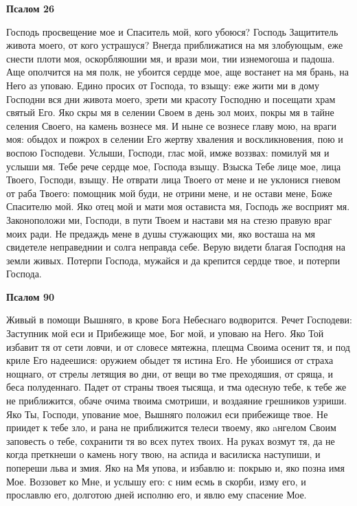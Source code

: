 \medskip


\bfseries Псалом 26\normalfont{}\nopagebreak


Господь просвещение мое и Спаситель мой, кого убоюся? Господь Защититель живота моего, от кого устрашуся? Внегда приближатися на мя злобующым, еже снести плоти моя, оскорбляюшии мя, и врази мои, тии изнемогоша и падоша. Аще ополчится на мя полк, не убоится сердце мое, аще востанет на мя брань, на Него аз уповаю. Едино просих от Господа, то взыщу: еже жити ми в дому Господни вся дни живота моего, зрети ми красоту Господню и посещати храм святый Его. Яко скры мя в селении Своем в день зол моих, покры мя в тайне селения Своего, на камень вознесе мя. И ныне се вознесе главу мою, на враги моя: обыдох и пожрох в селении Его жертву хваления и воскликновения, пою и воспою Господеви. Услыши, Господи, глас мой, имже воззвах: помилуй мя и услыши мя. Тебе рече сердце мое, Господа взыщу. Взыска Тебе лице мое, лица Твоего, Господи, взыщу. Не отврати лица Твоего от мене и не уклонися гневом от раба Твоего: помощник мой буди, не отрини мене, и не остави мене, Боже Спасителю мой. Яко отец мой и мати моя остависта мя, Господь же восприят мя. Законоположи ми, Господи, в пути Твоем и настави мя на стезю правую враг моих ради. Не предаждь мене в душы стужающих ми, яко восташа на мя свидетеле неправеднии и солга неправда себе. Верую видети благая Господня на земли живых. Потерпи Господа, мужайся и да крепится сердце твое, и потерпи Господа.


\medskip


\bfseries Псалом 90\normalfont{}\nopagebreak


Живый в помощи Вышняго, в крове Бога Небеснаго водворится. Речет Господеви: Заступник мой еси и Прибежище мое, Бог мой, и уповаю на Него. Яко Той избавит тя от сети ловчи, и от словесе мятежна, плещма Своима осенит тя, и под криле Его надеешися: оружием обыдет тя истина Его. Не убоишися от страха нощнаго, от стрелы летящия во дни, от вещи во тме преходяшия, от сряща, и беса полуденнаго. Падет от страны твоея тысяща, и тма одесную тебе, к тебе же не приближится, обаче очима твоима смотриши, и воздаяние грешников узриши. Яко Ты, Господи, упование мое, Вышняго положил еси прибежище твое. Не приидет к тебе зло, и рана не приближится телеси твоему, яко aнгелом Своим заповесть о тебе, сохранити тя во всех путех твоих. На руках возмут тя, да не когда преткнеши о камень ногу твою, на аспида и василиска наступиши, и попереши льва и змия. Яко на Мя упова, и избавлю и: покрыю и, яко позна имя Мое. Воззовет ко Мне, и услышу его: с ним есмь в скорби, изму его, и прославлю его, долготою дней исполню его, и явлю ему спасение Мое.


